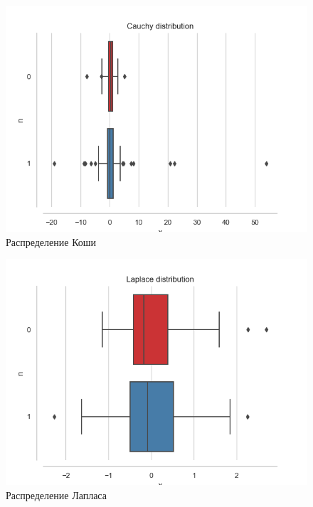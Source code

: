 \documentclass[12pt,a4paper]{article}
\begin{document}
\begin{figure}[H]
    \centering
    \includegraphics[scale=0.8]{images/cauchy.png}
    \caption{Распределение Коши}
    \label{fig:cauchy}
\end{figure}

\begin{figure}[H]
    \centering
    \includegraphics[scale=0.8]{images/laplace.png}
    \caption{Распределение Лапласа}
    \label{fig:laplace}
\end{figure}
\end{document}
